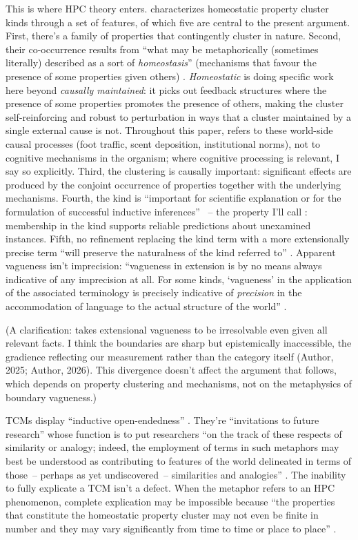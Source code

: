 \documentclass[12pt]{article}
\begin{document}
This is where HPC theory enters. \textcite[526--527]{boyd1979} characterizes homeostatic property cluster kinds through a set of features, of which five are central to the present argument. First, there's a family of properties that contingently cluster in nature. Second, their co-occurrence results from \enquote{what may be metaphorically (sometimes literally) described as a sort of \emph{homeostasis}} (mechanisms that favour the presence of some properties given others) \citep[526]{boyd1979}. \emph{Homeostatic} is doing specific work here beyond \emph{causally maintained}: it picks out feedback structures where the presence of some properties promotes the presence of others, making the cluster self-reinforcing and robust to perturbation in ways that a cluster maintained by a single external cause is not. Throughout this paper,  refers to these world-side causal processes (foot traffic, scent deposition, institutional norms), not to cognitive mechanisms in the organism; where cognitive processing is relevant, I say so explicitly. Third, the clustering is causally important: significant effects are produced by the conjoint occurrence of properties together with the underlying mechanisms. Fourth, the kind is \enquote{important for scientific explanation or for the formulation of successful inductive inferences} \citep[527]{boyd1979}~-- the property I'll call : membership in the kind supports reliable predictions about unexamined instances. Fifth, no refinement replacing the kind term with a more extensionally precise term \enquote{will preserve the naturalness of the kind referred to} \citep[527]{boyd1979}. Apparent vagueness isn't imprecision: \enquote{vagueness in extension is by no means always indicative of any imprecision at all. For some kinds, `vagueness' in the application of the associated terminology is precisely indicative of \emph{precision} in the accommodation of language to the actual structure of the world} \citep[530]{boyd1979}.

(A clarification: \textcite[527]{boyd1979} takes extensional vagueness to be irresolvable even given all relevant facts. I think the boundaries are sharp but epistemically inaccessible, the gradience reflecting our measurement rather than the category itself (Author, 2025; Author, 2026). This divergence doesn't affect the argument that follows, which depends on property clustering and mechanisms, not on the metaphysics of boundary vagueness.)

TCMs display \enquote{inductive open-endedness} \citep[488]{boyd1979}. They're \enquote{invitations to future research} whose function is to put researchers \enquote{on the track of these respects of similarity or analogy; indeed, the employment of terms in such metaphors may best be understood as contributing to features of the world delineated in terms of those~-- perhaps as yet undiscovered~-- similarities and analogies} \citep[488--489]{boyd1979}. The inability to fully explicate a TCM isn't a defect. When the metaphor refers to an HPC phenomenon, complete explication may be impossible because \enquote{the properties that constitute the homeostatic property cluster may not even be finite in number and they may vary significantly from time to time or place to place} \citep[529]{boyd1979}.
\end{document}
